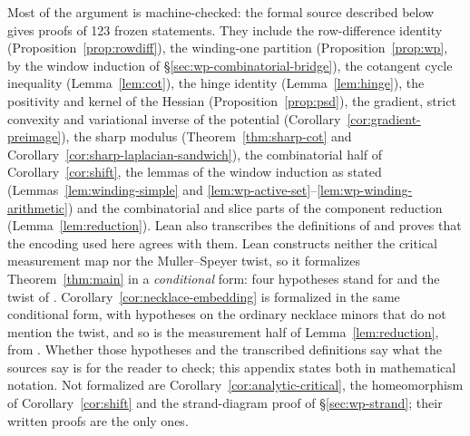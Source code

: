 \documentclass[11pt]{article}
\theoremstyle{definition}
\begin{document}
Most of the argument is machine-checked: the formal source described below gives proofs of 123 frozen statements.
They include the row-difference identity (Proposition~\ref{prop:rowdiff}), the winding-one
partition (Proposition~\ref{prop:wp}, by the window induction of \S\ref{sec:wp-combinatorial-bridge}), the cotangent
cycle inequality (Lemma~\ref{lem:cot}), the hinge identity (Lemma~\ref{lem:hinge}), the positivity and kernel of the
Hessian (Proposition~\ref{prop:psd}), the gradient, strict convexity and variational inverse of the potential
(Corollary~\ref{cor:gradient-preimage}), the sharp modulus (Theorem~\ref{thm:sharp-cot} and
Corollary~\ref{cor:sharp-laplacian-sandwich}), the combinatorial half of Corollary~\ref{cor:shift}, the lemmas of
the window induction as stated (Lemmas~\ref{lem:winding-simple} and
\ref{lem:wp-active-set}--\ref{lem:wp-winding-arithmetic}) and the combinatorial and slice parts of the component
reduction (Lemma~\ref{lem:reduction}). Lean also
transcribes the definitions of \cite{Galashin} and proves that the encoding used here agrees with them. Lean
constructs neither the critical measurement map nor the Muller--Speyer twist, so it formalizes Theorem~\ref{thm:main}
in a \emph{conditional} form: four hypotheses stand for \cite[Props.~5.1, 4.2 and~5.12 and Lem.~5.13]{Galashin}
and the twist of \cite{MullerSpeyer}. Corollary~\ref{cor:necklace-embedding} is formalized in the same conditional
form, with hypotheses on the ordinary necklace minors that do not mention the twist, and so is the measurement half
of Lemma~\ref{lem:reduction}, from \cite[Prop.~4.10]{Galashin}. Whether those hypotheses and the transcribed
definitions say what the sources say is for the reader to check; this appendix states both in
mathematical notation. Not formalized are Corollary~\ref{cor:analytic-critical}, the homeomorphism of Corollary~\ref{cor:shift} and
the strand-diagram proof of \S\ref{sec:wp-strand}; their written proofs are the only ones.
\end{document}
